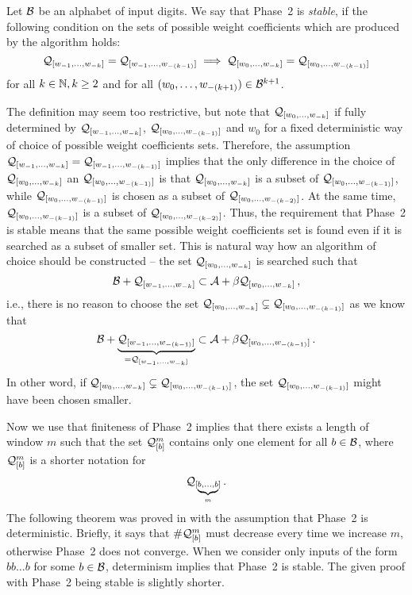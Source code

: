 \begin{defn}
Let $\mathcal{B}$ be an alphabet of input digits. We say that Phase~2 is \emph{stable}, if the following condition on the sets of possible weight coefficients which are produced by the algorithm holds: 
$$
\mathcal{Q}_{[w_{-1}, \dots, w_{-k}]}=\mathcal{Q}_{[w_{-1}, \dots, w_{-(k-1)}]} \implies \mathcal{Q}_{[w_{0}, \dots, w_{-k}]}=\mathcal{Q}_{[w_{0}, \dots, w_{-(k-1)}]}
$$
for all $k\in\mathbb{N}, k\geq 2$ and for all $(w_{0}, \dots, w_{-(k+1)}) \in \mathcal{B}^{k+1}$.

\end{defn}
The definition may seem too restrictive, but note that $\mathcal{Q}_{[w_{0}, \dots, w_{-k}]}$ if fully determined by $\mathcal{Q}_{[w_{-1}, \dots, w_{-k}]}$, $\mathcal{Q}_{[w_{0}, \dots, w_{-(k-1)}]}$ and $w_0$ for a fixed deterministic way of choice of possible weight coefficients sets. Therefore, the assumption $\mathcal{Q}_{[w_{-1}, \dots, w_{-k}]}=\mathcal{Q}_{[w_{-1}, \dots, w_{-(k-1)}]}$ implies that the only difference in the choice of $\mathcal{Q}_{[w_{0}, \dots, w_{-k}]}$ an $\mathcal{Q}_{[w_{0}, \dots, w_{-(k-1)}]}$ is that $\mathcal{Q}_{[w_{0}, \dots, w_{-k}]}$ is a subset of  $\mathcal{Q}_{[w_{0}, \dots, w_{-(k-1)}]}$, while $\mathcal{Q}_{[w_{0}, \dots, w_{-(k-1)}]}$ is chosen as a subset of $\mathcal{Q}_{[w_{0}, \dots, w_{-(k-2)}]}$. At the same time, $\mathcal{Q}_{[w_{0}, \dots, w_{-(k-1)}]}$ is a subset of $\mathcal{Q}_{[w_{0}, \dots, w_{-(k-2)}]}$. Thus, the requirement that Phase~2 is stable means that the same possible weight coefficients set is found even if it is searched as a subset of smaller set. This is natural way how an algorithm of choice should be constructed -- the set $\mathcal{Q}_{[w_{0}, \dots, w_{-k}]}$ is searched such that
$$
\mathcal{B}+\mathcal{Q}_{[w_{-1}, \dots, w_{-k}]} \subset \mathcal{A}+\beta \mathcal{Q}_{[w_{0}, \dots, w_{-k}]}\,,
$$
i.e., there is no reason to choose the set $\mathcal{Q}_{[w_{0}, \dots, w_{-k}]}\subsetneq\mathcal{Q}_{[w_{0}, \dots, w_{-(k-1)}]}$ as we know that
$$
\mathcal{B}+\underbrace{\mathcal{Q}_{[w_{-1}, \dots, w_{-(k-1)}]}}_{=\mathcal{Q}_{[w_{-1}, \dots, w_{-k}]}} \subset \mathcal{A}+\beta \mathcal{Q}_{[w_{0}, \dots, w_{-(k-1)}]}\,.
$$
In other word, if $\mathcal{Q}_{[w_{0}, \dots, w_{-k}]}\subsetneq\mathcal{Q}_{[w_{0}, \dots, w_{-(k-1)}]}$, the set $\mathcal{Q}_{[w_{0}, \dots, w_{-(k-1)}]}$ might have been chosen smaller.

Now we use that finiteness of Phase~2 implies that there exists a length of window $m$ such that the set $\mathcal{Q}_{[\scriptstyle b]}^{\scriptstyle m}$ contains only one element for all $b\in\mathcal{B}$, where $\mathcal{Q}_{[\scriptstyle b]}^{\scriptstyle m}$ is a shorter notation for
$$
\mathcal{Q}_{[\underbrace{\scriptstyle b,\dots,b}_m]}\,.
$$
The following theorem was proved in \cite{vu} with the assumption that Phase~2 is deterministic. Briefly, it says that $\#\mathcal{Q}_{[\scriptstyle b]}^{\scriptstyle m}$ must decrease every time we increase $m$, otherwise Phase~2 does not converge. When we consider only inputs of the form $bb\dots b$ for some $b\in\mathcal{B}$, determinism implies that Phase~2 is stable. The given proof with Phase~2 being stable is slightly shorter.

